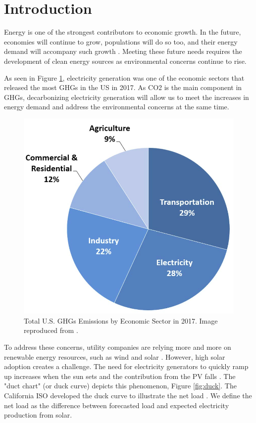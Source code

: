 \documentclass[11pt,letterpaper]{article}
\begin{document}
\section{Introduction}

Energy is one of the strongest contributors to economic growth.
In the future, economies will continue to grow, populations will do so too, and their energy demand will accompany such growth \cite{burke_impact_2018} \cite{el-shafie_hydrogen_2019}.
Meeting these future needs requires the development of clean energy sources as environmental concerns continue to rise.

As seen in Figure \ref{fig:ghg}, electricity generation was one of the economic sectors that released the most \glspl{GHG} in the \gls{US} in 2017.
As \gls{CO2} is the main component in \glspl{GHG}, decarbonizing electricity generation will allow us to meet the increases in energy demand and address the environmental concerns at the same time.

\begin{figure}[htbp!]
	\centering
	\includegraphics[width=0.6\linewidth]{figures/total-ghg-2017.png}
	\hfill
	\caption{Total U.S. \glspl{GHG} Emissions by Economic Sector in 2017. Image reproduced from \cite{us_epa_sources_2020}.}
	\label{fig:ghg}
\end{figure}

To address these concerns, utility companies are relying more and more on renewable energy resources, such as wind and solar \cite{ming_resource_2019}.
However, high solar adoption creates a challenge.
The need for electricity generators to quickly ramp up increases when the sun sets and the contribution from the \gls{PV} falls \cite{us_department_of_energy_confronting_2017}.
The "duct chart" (or duck curve) depicts this phenomenon, Figure \ref{fig:duck}.
The California ISO developed the duck curve to illustrate the net load \cite{bouillon_prepared_2014}.
We define the net load as the difference between forecasted load and expected electricity production from solar.
\end{document}
